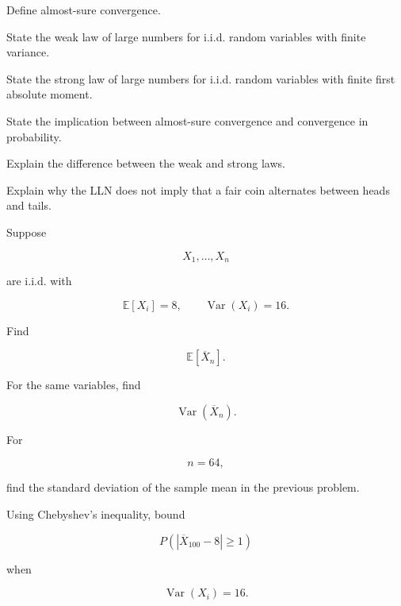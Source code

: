 \begin{exercise}[1]
Define almost-sure convergence.
\end{exercise}

\begin{exercise}[1]
State the weak law of large numbers for i.i.d. random variables with
finite variance.
\end{exercise}

\begin{exercise}[1]
State the strong law of large numbers for i.i.d. random variables with
finite first absolute moment.
\end{exercise}

\begin{exercise}[1]
State the implication between almost-sure convergence and convergence in
probability.
\end{exercise}

\begin{exercise}[1]
Explain the difference between the weak and strong laws.
\end{exercise}

\begin{exercise}[1]
Explain why the LLN does not imply that a fair coin alternates between
heads and tails.
\end{exercise}

\begin{exercise}[2]
Suppose

\[
X_1,\ldots,X_n
\]

are i.i.d. with

\[
\mathbb{E}[X_i]=8,
\qquad
\operatorname{Var}(X_i)=16.
\]

Find

\[
\mathbb{E}[\overline{X}_n].
\]
\end{exercise}

\begin{exercise}[2]
For the same variables, find

\[
\operatorname{Var}(\overline{X}_n).
\]
\end{exercise}

\begin{exercise}[2]
For

\[
n=64,
\]

find the standard deviation of the sample mean in the previous problem.
\end{exercise}

\begin{exercise}[2]
Using Chebyshev's inequality, bound

\[
P
\left(
|\overline{X}_{100}-8|
\geq1
\right)
\]

when

\[
\operatorname{Var}(X_i)=16.
\]
\end{exercise}

